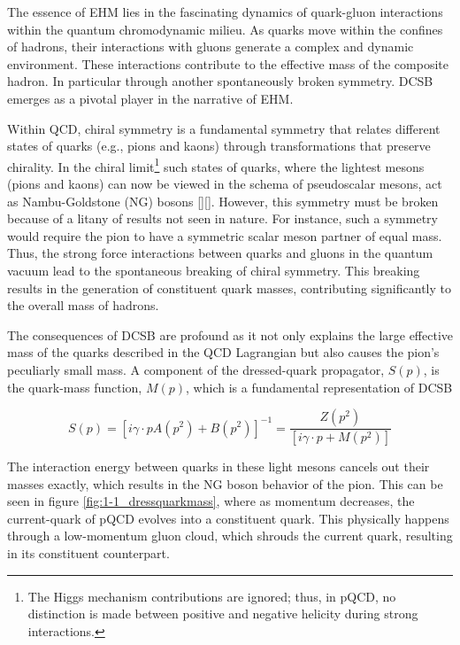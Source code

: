 \documentclass[
]{report}
\begin{document}
The essence of EHM lies in the fascinating dynamics of quark-gluon
interactions within the quantum chromodynamic milieu. As quarks move
within the confines of hadrons, their interactions with gluons generate
a complex and dynamic environment. These interactions contribute to the
effective mass of the composite hadron. In particular through another
spontaneously broken symmetry. DCSB emerges as a pivotal player in the
narrative of EHM.

Within QCD, chiral symmetry is a fundamental symmetry that relates
different states of quarks (e.g., pions and kaons) through
transformations that preserve chirality. In the chiral
limit\footnote{The Higgs mechanism contributions are ignored; thus, in pQCD, no distinction is made between positive and negative helicity during strong interactions. }
such states of quarks, where the lightest mesons (pions and kaons) can
now be viewed in the schema of pseudoscalar mesons, act as
Nambu-Goldstone (NG) bosons
{[}\cite{munczek_dynamical_1995}{]}{[}\cite{aguilar_pion_2019}{]}.
However, this symmetry must be broken because of a litany of results not
seen in nature. For instance, such a symmetry would require the pion to
have a symmetric scalar meson partner of equal mass. Thus, the strong
force interactions between quarks and gluons in the quantum vacuum lead
to the spontaneous breaking of chiral symmetry. This breaking results in
the generation of constituent quark masses, contributing significantly
to the overall mass of hadrons.



The consequences of DCSB are profound as it not only explains the large
effective mass of the quarks described in the QCD Lagrangian but also
causes the pion's peculiarly small mass. A component of the
dressed-quark propagator, \(S(p)\), is the quark-mass function,
\(M(p)\), which is a fundamental representation of DCSB

\begin{equation} 
    S(p)=[i\gamma\cdot pA(p^2)+B(p^2)]^{-1}=\frac{Z(p^2)}{[i\gamma\cdot p+M(p^2)]}
  \label{eq:dressed_q_prop} 
\end{equation}

\noindent The interaction energy between quarks in these light mesons
cancels out their masses exactly, which results in the NG boson behavior
of the pion. This can be seen in figure \ref{fig:1-1_dressquarkmass},
where as momentum decreases, the current-quark of pQCD evolves into a
constituent quark. This physically happens through a low-momentum gluon
cloud, which shrouds the current quark, resulting in its constituent
counterpart.
\end{document}
